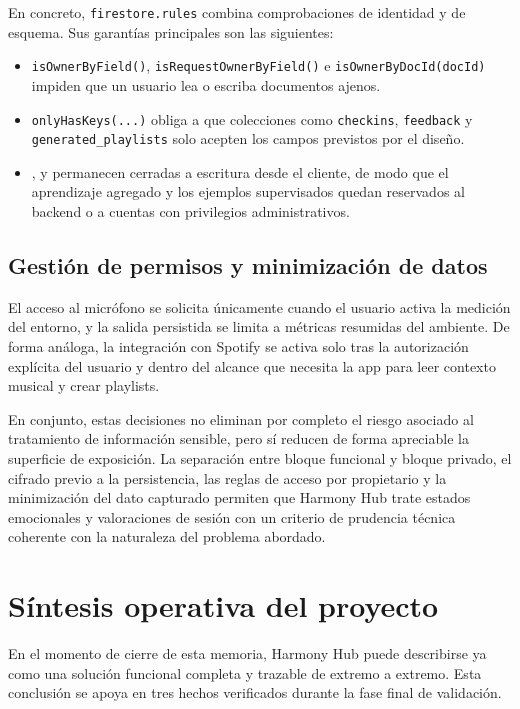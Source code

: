 En concreto, \texttt{firestore.rules} combina comprobaciones de identidad y de
esquema. Sus garantías principales son las siguientes:

\begin{itemize}
\item \texttt{isOwnerByField()}, \texttt{isRequestOwnerByField()} e \texttt{isOwnerByDocId(docId)} impiden que un usuario lea o escriba documentos ajenos.
\item \texttt{onlyHasKeys(...)} obliga a que colecciones como \texttt{checkins}, \texttt{feedback} y \texttt{generated\_playlists} solo acepten los campos previstos por el diseño.
\item \texttt{}, \texttt{} y \texttt{} permanecen cerradas a escritura desde el cliente, de modo que el aprendizaje agregado y los ejemplos supervisados quedan reservados al backend o a cuentas con privilegios administrativos.
\end{itemize}

\subsection{Gestión de permisos y minimización de datos}

El acceso al micrófono se solicita únicamente cuando el usuario activa la
medición del entorno, y la salida persistida se limita a métricas resumidas del
ambiente. De forma análoga, la integración con Spotify se activa solo tras la
autorización explícita del usuario y dentro del alcance que necesita la app
para leer contexto musical y crear playlists.

En conjunto, estas decisiones no eliminan por completo el riesgo asociado al
tratamiento de información sensible, pero sí reducen de forma apreciable la
superficie de exposición. La separación entre bloque funcional y bloque privado,
el cifrado previo a la persistencia, las reglas de acceso por propietario y la
minimización del dato capturado permiten que Harmony Hub trate estados
emocionales y valoraciones de sesión con un criterio de prudencia técnica
coherente con la naturaleza del problema abordado.

\section{Síntesis operativa del proyecto}
\label{sec:estado_actual_proyecto}

En el momento de cierre de esta memoria, Harmony Hub puede describirse ya como
una solución funcional completa y trazable de extremo a extremo. Esta
conclusión se apoya en tres hechos verificados durante la fase final de
validación.

